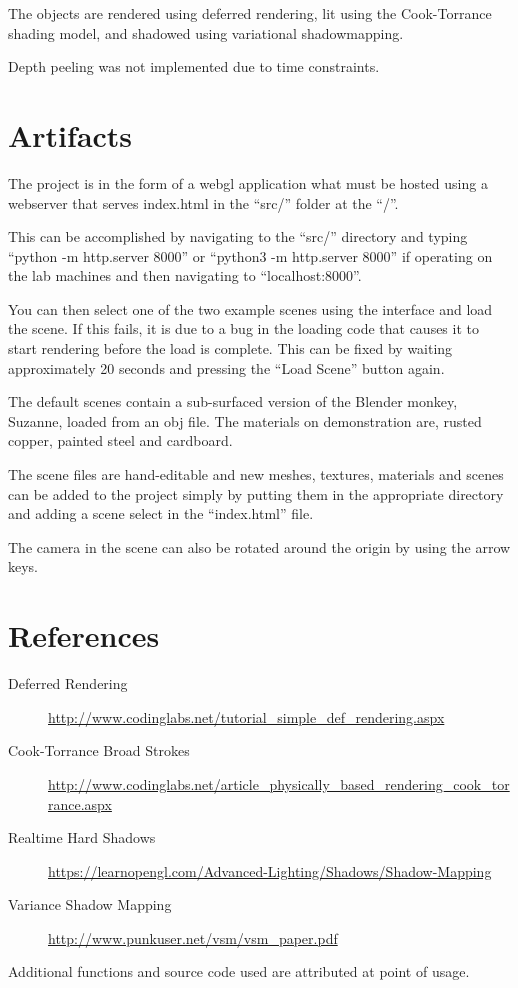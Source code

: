 \documentclass{article}
\begin{document}
The objects are rendered using deferred rendering, lit using the Cook-Torrance
shading model, and shadowed using variational shadowmapping.

Depth peeling was not implemented due to time constraints.

\section{Artifacts}

The project is in the form of a webgl application what must be hosted using a
webserver that serves index.html in the ``src/'' folder at the ``/''.

This can be accomplished by navigating to the ``src/'' directory and typing
``python -m http.server 8000'' or ``python3 -m http.server 8000'' if operating
on the lab machines and then navigating to ``localhost:8000''.

You can then select one of the two example scenes using the interface and load
the scene. If this fails, it is due to a bug in the loading code that causes it
to start rendering before the load is complete. This can be fixed by waiting
approximately 20 seconds and pressing the ``Load Scene'' button again.

The default scenes contain a sub-surfaced version of the Blender monkey,
Suzanne, loaded from an obj file. The materials on demonstration are, rusted
copper, painted steel and cardboard. 

The scene files are hand-editable and new meshes, textures, materials and scenes
can be added to the project simply by putting them in the appropriate directory
and adding a scene select in the ``index.html'' file.

The camera in the scene can also be rotated around the origin by using the
arrow keys.

\section{References}

\begin{description}
    \item[Deferred Rendering]           \url{http://www.codinglabs.net/tutorial\_simple\_def\_rendering.aspx}
    \item[Cook-Torrance Broad Strokes]  \url{http://www.codinglabs.net/article\_physically\_based\_rendering\_cook\_torrance.aspx}
    \item[Realtime Hard Shadows]        \url{https://learnopengl.com/Advanced-Lighting/Shadows/Shadow-Mapping}
    \item[Variance Shadow Mapping]      \url{http://www.punkuser.net/vsm/vsm\_paper.pdf}
\end{description}

Additional functions and source code used are attributed at point of usage. 
\end{document}
